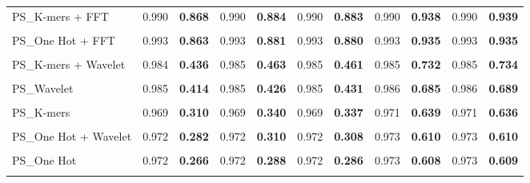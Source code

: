 \begin{table*}[htbp]
\begin{tabular}{lcccccccccc}
PS\_K-mers + FFT & 0.990 & \textbf{0.868} & 0.990 & \textbf{0.884} & 0.990 & \textbf{0.883} & 0.990 & \textbf{0.938} & 0.990 & \textbf{0.939} \\\\
PS\_One Hot + FFT & 0.993 & \textbf{0.863} & 0.993 & \textbf{0.881} & 0.993 & \textbf{0.880} & 0.993 & \textbf{0.935} & 0.993 & \textbf{0.935} \\\\
PS\_K-mers + Wavelet & 0.984 & \textbf{0.436} & 0.985 & \textbf{0.463} & 0.985 & \textbf{0.461} & 0.985 & \textbf{0.732} & 0.985 & \textbf{0.734} \\\\
PS\_Wavelet & 0.985 & \textbf{0.414} & 0.985 & \textbf{0.426} & 0.985 & \textbf{0.431} & 0.986 & \textbf{0.685} & 0.986 & \textbf{0.689} \\\\
PS\_K-mers & 0.969 & \textbf{0.310} & 0.969 & \textbf{0.340} & 0.969 & \textbf{0.337} & 0.971 & \textbf{0.639} & 0.971 & \textbf{0.636} \\\\
PS\_One Hot + Wavelet & 0.972 & \textbf{0.282} & 0.972 & \textbf{0.310} & 0.972 & \textbf{0.308} & 0.973 & \textbf{0.610} & 0.973 & \textbf{0.610} \\\\
PS\_One Hot & 0.972 & \textbf{0.266} & 0.972 & \textbf{0.288} & 0.972 & \textbf{0.286} & 0.973 & \textbf{0.608} & 0.973 & \textbf{0.609} \\\\
\bottomrule
\end{tabular}
\end{table*}